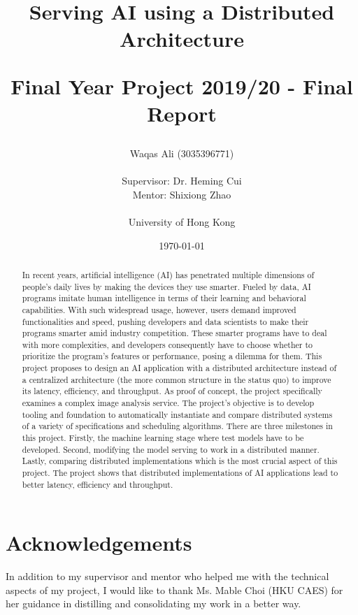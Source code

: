\documentclass{report}
\title{
  Serving AI using a Distributed Architecture \\ 
\begin{large} 
  Final Year Project 2019/20 - Final Report
\end{large} }
\author{Waqas Ali (3035396771)\\\\Supervisor: Dr. Heming Cui\\Mentor: Shixiong Zhao\\\\University of Hong Kong}
\date{\today}
\def\frontmatter{%
    \pagenumbering{roman}
    \setcounter{page}{1}
    \renewcommand{\thesection}{\Roman{section}}
}%
\begin{document}
\maketitle

\frontmatter

\begin{abstract}
\thispagestyle{plain}

In recent years, artificial intelligence (AI) has penetrated multiple dimensions of people's daily lives by making the devices they use smarter.
Fueled by data, AI programs imitate human intelligence in terms of their learning and behavioral capabilities.
With such widespread usage, however, users demand improved functionalities and speed, pushing developers and data scientists to make their programs smarter amid industry competition.
These smarter programs have to deal with more complexities, and developers consequently have to choose whether to prioritize the program's features or performance, posing a dilemma for them.
This project proposes to design an AI application with a distributed architecture instead of a centralized architecture (the more common structure in the status quo) to improve its latency, efficiency, and throughput.
As proof of concept, the project specifically examines a complex image analysis service.
The project's objective is to develop tooling and foundation to automatically instantiate and compare distributed systems of a variety of specifications and scheduling algorithms.
There are three milestones in this project.
Firstly, the machine learning stage where test models have to be developed.
Second, modifying the model serving to work in a distributed manner.
Lastly, comparing distributed implementations which is the most crucial aspect of this project.
The project shows that distributed implementations of AI applications lead to better latency, efficiency and throughput.

\end{abstract}

\section*{Acknowledgements}
In addition to my supervisor and mentor who helped me with the technical aspects of my project, I would like to thank Ms. Mable Choi (HKU CAES) for her guidance in distilling and consolidating my work in a better way.

\setcounter{page}{2}
\tableofcontents
\end{document}
